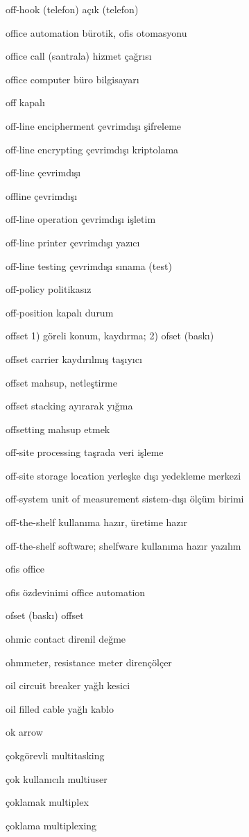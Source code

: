 \documentclass[12pt,fleqn]{article}\usepackage{../../common}
\begin{document}
off-hook (telefon) açık (telefon)

office automation bürotik, ofis otomasyonu

office call (santrala) hizmet çağrısı

office computer büro bilgisayarı

off kapalı

off-line encipherment çevrimdışı şifreleme

off-line encrypting çevrimdışı kriptolama

off-line çevrimdışı

offline çevrimdışı

off-line operation çevrimdışı işletim

off-line printer çevrimdışı yazıcı

off-line testing çevrimdışı sınama (test)

off-policy politikasız

off-position kapalı durum

offset 1) göreli konum, kaydırma; 2) ofset (baskı)

offset carrier kaydırılmış taşıyıcı

offset mahsup, netleştirme

offset stacking ayırarak yığma

offsetting mahsup etmek

off-site processing taşrada veri işleme

off-site storage location yerleşke dışı yedekleme merkezi

off-system unit of measurement sistem-dışı ölçüm birimi

off-the-shelf kullanıma hazır, üretime hazır

off-the-shelf software; shelfware kullanıma hazır yazılım

ofis office

ofis özdevinimi office automation

ofset (baskı) offset

ohmic contact direnil değme

ohmmeter, resistance meter dirençölçer

oil circuit breaker yağlı kesici

oil filled cable yağlı kablo

ok arrow

çokgörevli multitasking

çok kullanıcılı multiuser

çoklamak multiplex

çoklama multiplexing
\end{document}
